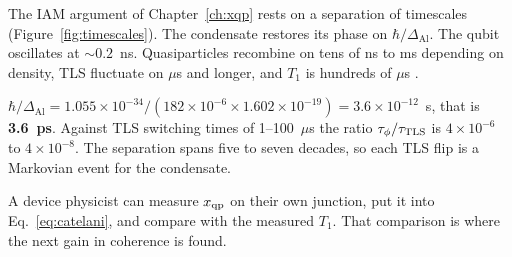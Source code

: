 The IAM argument of Chapter~\ref{ch:xqp} rests on a separation of timescales
(Figure~\ref{fig:timescales}). The condensate restores its phase on $\hbar/\Delta_{\mathrm{Al}}$.
The qubit oscillates at $\sim0.2$~ns. Quasiparticles recombine on tens of ns to ms depending
on density, TLS fluctuate on $\mu$s and longer, and $T_1$ is hundreds of $\mu$s \observed.

\begin{checkbox}
$\hbar/\Delta_{\mathrm{Al}}=1.055\times10^{-34}/(182\times10^{-6}\times1.602\times10^{-19})=3.6\times10^{-12}$~s,
that is \textbf{3.6~ps}. Against TLS switching times of 1--100~$\mu$s the ratio $\tau_\phi/\tau_{\mathrm{TLS}}$ is
$4\times10^{-6}$ to $4\times10^{-8}$. The separation spans five to seven decades, so each TLS flip is a
Markovian event for the condensate. \calc
\end{checkbox}

A device physicist can measure $x_{\mathrm{qp}}$ on their own junction, put it into Eq.~\eqref{eq:catelani}, and compare with the measured $T_1$. That comparison is where the next gain in coherence is found.
